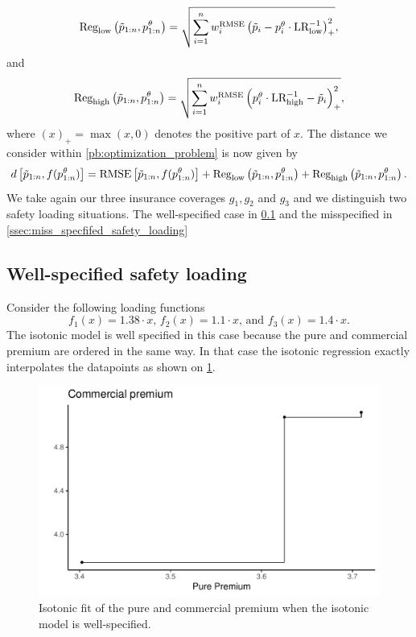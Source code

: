 \documentclass[10pt]{article}
\begin{document}
\begin{equation*}\label{eq:LR_bounds1}
\text{Reg}_{\text{low}}\left(\Tilde{p}_{1:n}, p_{1:n}^\theta\right) = \sqrt{\sum_{i=1}^nw_i^{\text{RMSE}}\left(\Tilde{p}_i - p_i^\theta \cdot \text{LR}_{\text{low}}^{-1}\right)_+^2}, 
\end{equation*}
and 
\begin{equation*}\label{eq:LR_bounds2}
\text{Reg}_{\text{high}}\left(\Tilde{p}_{1:n}, p_{1:n}^\theta\right) = \sqrt{\sum_{i=1}^nw_i^{\text{RMSE}}\left(p_i^\theta \cdot \text{LR}_{\text{high}}^{-1} - \Tilde{p}_i\right)_+^2},
\end{equation*}
where \((x)_+ = \max(x,0)\) denotes the positive part of \(x\). The distance we consider within \cref{pb:optimization_problem} is now given by 
\[
d\left[\Tilde{p}_{1:n}, f(p_{1:n}^\theta)\right] = \text{RMSE}\left[\Tilde{p}_{1:n}, f(p_{1:n}^\theta)\right] + \text{Reg}_{\text{low}}\left(\Tilde{p}_{1:n}, p_{1:n}^\theta\right) + \text{Reg}_{\text{high}}\left(\Tilde{p}_{1:n}, p_{1:n}^\theta\right).
\]
We take again our three insurance coverages $g_1, g_2$ and $g_3$ and we distinguish two safety loading situations. The well-specified case in \cref{ssec:well_specfifed_safety_loading} and the misspecified  in \cref{ssec:miss_specfifed_safety_loading}
\subsection{Well-specified safety loading}\label{ssec:well_specfifed_safety_loading}
Consider the following loading functions
$$
f_1(x) = 1.38\cdot x\text{, }f_2(x) = 1.1\cdot x \text{, and } f_3(x) = 1.4\cdot x. 
$$
The isotonic model is well specified in this case because the pure and commercial premium are ordered in the same way. In that case the isotonic regression exactly interpolates the datapoints as shown on \cref{fig:pp_cp_well_specified}.

\begin{figure}[!ht]
  \begin{center}
  \includegraphics[width=0.7\linewidth]{../figures/pp_cp_well_specified}
    \caption{Isotonic fit of the pure and commercial premium when the isotonic model is well-specified.}
    \label{fig:pp_cp_well_specified}
  \end{center}
\end{figure}
\end{document}
